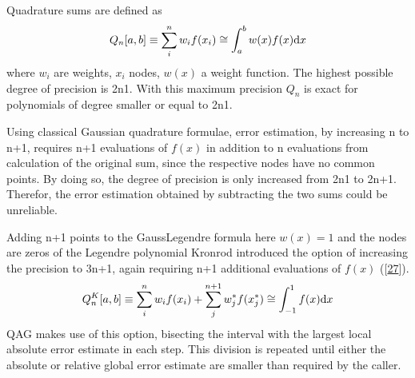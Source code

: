 \documentclass[letterpaper,10pt,english]{sphinxmanual}
\begin{document}
\sphinxAtStartPar
Quadrature sums are defined as
\begin{equation*}
\begin{split}Q_n[a,b] \equiv \sum_i^nw_if(x_i) \cong \int_a^bw(x)f(x)\textup{d}x\end{split}
\end{equation*}
\sphinxAtStartPar
where \(w_i\) are weights, \(x_i\) nodes, \(w(x)\) a weight function.
The highest possible degree of precision is 2n\sphinxhyphen{}1. With this maximum precision \(Q_n\) is exact for polynomials of degree smaller or equal to 2n\sphinxhyphen{}1.

\sphinxAtStartPar
Using classical Gaussian quadrature formulae, error estimation, by increasing n to n+1, requires n+1 evaluations of \(f(x)\) in addition to n evaluations from
calculation of the original sum, since the respective nodes have no common points. By doing so, the degree of precision is only increased from 2n\sphinxhyphen{}1 to 2n+1.
Therefor, the error estimation obtained by subtracting the two sums could be unreliable.

\sphinxAtStartPar
Adding n+1 points to the Gauss\sphinxhyphen{}Legendre formula \sphinxhyphen{} here \(w(x)=1\) and the nodes are zeros of the Legendre polynomial \sphinxhyphen{}
Kronrod introduced the option of increasing the precision to 3n+1, again requiring n+1 additional evaluations of \(f(x)\) ({[}\hyperlink{cite.NBodySimulation/Appendix:id26}{27}{]}).
\begin{equation*}
\begin{split}Q_n^K[a,b] \equiv \sum_i^nw_if(x_i) + \sum_j^{n+1}w_j^*f(x_j^*) \cong \int_{-1}^1f(x)\textup{d}x\end{split}
\end{equation*}
\sphinxAtStartPar
QAG makes use of this option, bisecting the interval with the largest local absolute error estimate in each step.
This division is repeated until either the absolute or relative global error estimate are smaller than required by the caller.
\end{document}

